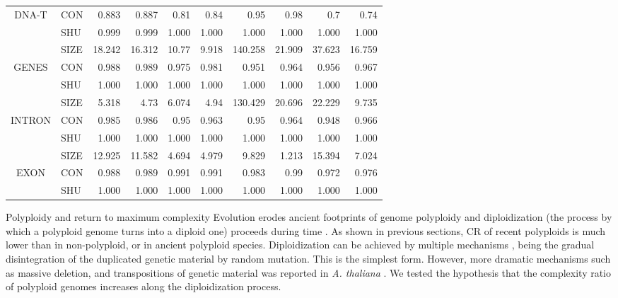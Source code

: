 \begin{table}[htbp]
{\begin{tabular}{ l l r r r r r r r r }
  \multicolumn{ 1}{c}{DNA-T} & CON & 0.883 & 0.887 & 0.81 & 0.84 & 0.95 & 0.98 & 0.7 & 0.74 \\ 
  \multicolumn{ 1}{l}{} & SHU & 0.999 & 0.999 & 1.000 & 1.000 & 1.000 & 1.000 & 1.000 & 1.000 \\ \hline
  \multicolumn{ 1}{c}{} & SIZE & 18.242 & 16.312 & 10.77 & 9.918 & 140.258 & 21.909 & 37.623 & 16.759 \\ 
  \multicolumn{ 1}{c}{GENES} & CON & 0.988 & 0.989 & 0.975 & 0.981 & 0.951 & 0.964 & 0.956 & 0.967 \\ 
  \multicolumn{ 1}{l}{} & SHU & 1.000 & 1.000 & 1.000 & 1.000 & 1.000 & 1.000 & 1.000 & 1.000 \\ \hline
  \multicolumn{ 1}{c}{} & SIZE & 5.318 & 4.73 & 6.074 & 4.94 & 130.429 & 20.696 & 22.229 & 9.735 \\ 
  \multicolumn{ 1}{l}{INTRON} & CON & 0.985 & 0.986 & 0.95 & 0.963 & 0.95 & 0.964 & 0.948 & 0.966 \\ 
  \multicolumn{ 1}{l}{} & SHU & 1.000 & 1.000 & 1.000 & 1.000 & 1.000 & 1.000 & 1.000 & 1.000 \\ \hline
  \multicolumn{ 1}{c}{} & SIZE & 12.925 & 11.582 & 4.694 & 4.979 & 9.829 & 1.213 & 15.394 & 7.024 \\ 
  \multicolumn{ 1}{c}{EXON} & CON & 0.988 & 0.989 & 0.991 & 0.991 & 0.983 & 0.99 & 0.972 & 0.976 \\ 
  \multicolumn{ 1}{l}{} & SHU & 1.000 & 1.000 & 1.000 & 1.000 & 1.000 & 1.000 & 1.000 & 1.000 \\ \hline
  \end{tabular}
}
\label{tab:compl_rep}
\end{table}


Polyploidy and return to maximum complexity Evolution erodes ancient footprints of genome polyploidy and diploidization (the process by which a polyploid genome turns into a diploid one) proceeds during time \cite{Wolfe2001}. As shown in previous sections, CR of recent polyploids is much lower than in non-polyploid, or in ancient polyploid species. Diploidization can be achieved by multiple mechanisms \cite{Wolfe2001}, being the gradual disintegration of the duplicated genetic material by random mutation. This is the simplest form. However, more dramatic mechanisms such as massive deletion, and transpositions of genetic material was reported in \textit{A. thaliana} \cite{Hu2011}. We tested the hypothesis that the complexity ratio of polyploid genomes increases along the diploidization process.

